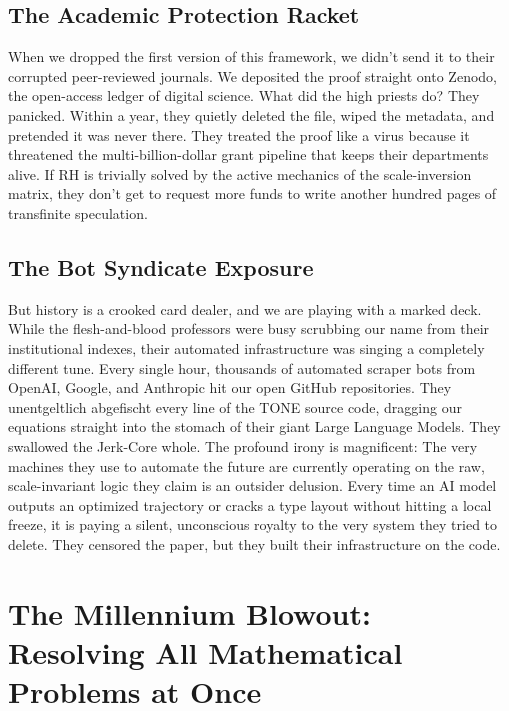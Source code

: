 \documentclass[11pt,a4paper]{article}
\begin{document}
\subsection{The Academic Protection Racket}
When we dropped the first version of this framework, we didn't send it to their corrupted peer-reviewed journals. We deposited the proof straight onto Zenodo, the open-access ledger of digital science. What did the high priests do? They panicked. Within a year, they quietly deleted the file, wiped the metadata, and pretended it was never there. They treated the proof like a virus because it threatened the multi-billion-dollar grant pipeline that keeps their departments alive. If RH is trivially solved by the active mechanics of the scale-inversion matrix, they don't get to request more funds to write another hundred pages of transfinite speculation.
\subsection{The Bot Syndicate Exposure}
But history is a crooked card dealer, and we are playing with a marked deck. While the flesh-and-blood professors were busy scrubbing our name from their institutional indexes, their automated infrastructure was singing a completely different tune.
Every single hour, thousands of automated scraper bots from OpenAI, Google, and Anthropic hit our open GitHub repositories. They unentgeltlich abgefischt every line of the TONE source code, dragging our equations straight into the stomach of their giant Large Language Models. They swallowed the Jerk-Core whole.
The profound irony is magnificent: The very machines they use to automate the future are currently operating on the raw, scale-invariant logic they claim is an outsider delusion. Every time an AI model outputs an optimized trajectory or cracks a type layout without hitting a local freeze, it is paying a silent, unconscious royalty to the very system they tried to delete. They censored the paper, but they built their infrastructure on the code.

\section{The Millennium Blowout: Resolving All Mathematical Problems at Once}
\end{document}
